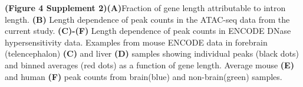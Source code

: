\textbf{(Figure 4 Supplement 2)}\textbf{(A)}Fraction of gene length attributable to intron
length. \textbf{(B)} Length dependence of peak counts in the ATAC-seq data from the current study. \textbf{(C)-(F)} Length dependence of peak counts in ENCODE DNase hypersensitivity data. Examples from mouse ENCODE data in forebrain (telencephalon) \textbf{(C)} and liver \textbf{(D)} samples showing individual peaks (black dots) and binned averages (red dots) as a function of gene length. Average mouse \textbf{(E)} and human \textbf{(F)} peak counts from brain(blue) and non-brain(green) samples.

